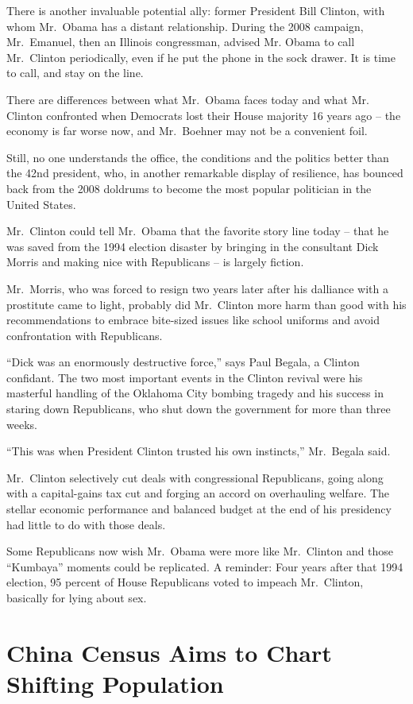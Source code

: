 ﻿\documentclass[12pt]{article}
\begin{document}
There is another invaluable potential ally: former President Bill Clinton, with whom Mr.~Obama has a
distant relationship. During the 2008 campaign, Mr.~Emanuel, then an Illinois congressman, advised
Mr. Obama to call Mr.~Clinton periodically, even if he put the phone in the sock drawer. It is time
to call, and stay on the line.

There are differences between what Mr.~Obama faces today and what Mr. Clinton confronted when
Democrats lost their House majority 16 years ago -- the economy is far worse now, and Mr.~Boehner
may not be a convenient foil.

Still, no one understands the office, the conditions and the politics better than the 42nd
president, who, in another remarkable display of resilience, has bounced back from the 2008 doldrums
to become the most popular politician in the United States.

Mr.~Clinton could tell Mr.~Obama that the favorite story line today -- that he was saved from the
1994 election disaster by bringing in the consultant Dick Morris and making nice with Republicans --
is largely fiction.

Mr.~Morris, who was forced to resign two years later after his dalliance with a prostitute came to
light, probably did Mr.~Clinton more harm than good with his recommendations to embrace bite-sized
issues like school uniforms and avoid confrontation with Republicans.

``Dick was an enormously destructive force,'' says Paul Begala, a Clinton confidant. The two most
important events in the Clinton revival were his masterful handling of the Oklahoma City bombing
tragedy and his success in staring down Republicans, who shut down the government for more than
three weeks.

``This was when President Clinton trusted his own instincts,'' Mr.~Begala said.

Mr.~Clinton selectively cut deals with congressional Republicans, going along with a capital-gains
tax cut and forging an accord on overhauling welfare. The stellar economic performance and balanced
budget at the end of his presidency had little to do with those deals.

Some Republicans now wish Mr.~Obama were more like Mr.~Clinton and those ``Kumbaya'' moments could
be replicated. A reminder: Four years after that 1994 election, 95 percent of House Republicans
voted to impeach Mr.~Clinton, basically for lying about sex.

\section{China Census Aims to Chart Shifting Population}
\end{document}
